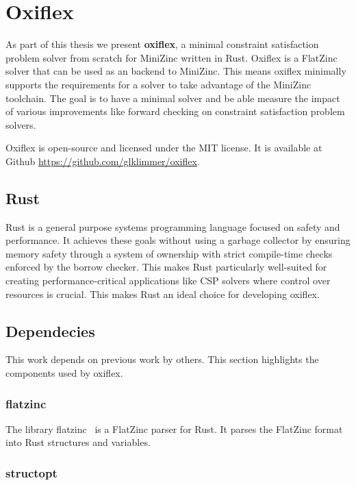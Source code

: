\chapter{Oxiflex}

As part of this thesis we present \textbf{oxiflex}, a minimal constraint satisfaction problem solver from scratch for MiniZinc written in Rust. Oxiflex is a FlatZinc solver that can be used as an backend to MiniZinc. This means oxiflex minimally supports the requirements for a solver to take advantage of the MiniZinc toolchain. The goal is to have a minimal solver and be able measure the impact of various improvements like forward checking on constraint satisfaction problem solvers.

Oxiflex is open-source and licensed under the MIT license. It is available at Github \url{https://github.com/glklimmer/oxiflex}.

\section{Rust}

Rust \cite{rust:2014} is a general purpose systems programming language focused on safety and performance. It achieves these goals without using a garbage collector by ensuring memory safety through a system of ownership with strict compile-time checks enforced by the borrow checker. This makes Rust particularly well-suited for creating performance-critical applications like CSP solvers where control over resources is crucial. This makes Rust an ideal choice for developing oxiflex.

\section{Dependecies}

This work depends on previous work by others. This section highlights the components used by oxiflex.

\subsection{flatzinc} \label{flatzinc}

The library flatzinc~\cite{flatzinc:2020} is a FlatZinc parser for Rust. It parses the FlatZinc format into Rust structures and variables.

\subsection{structopt}

